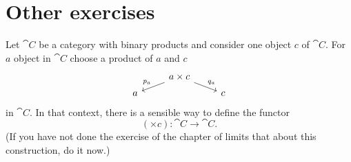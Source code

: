 
\section{Other exercises}

\begin{remark}
  Let \(\cat C\) be a category with binary products and consider one
  object \(c\) of \(\cat C\). For \(a\) object in \(\cat C\) choose a
  product of \(a\) and \(c\)
  \[\begin{tikzcd}[row sep=tiny]
      & a \times c \ar["{p_a}", dl, swap] \ar["{q_a}", dr] & \\
      a & & c
    \end{tikzcd}\] in \(\cat C\). In that context, there is a sensible
  way to define the functor
  \[(\times c) : \cat C \to \cat C .\] (If you have not done the exercise of
  the chapter of limits that about this construction, do it now.)
\end{remark}

